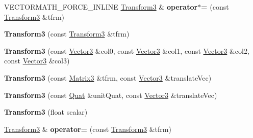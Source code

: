 \begin{DoxyCompactItemize}
\item 
\mbox{\label{classVectormath_1_1Aos_1_1Transform3_a300764b0cf9d1a9cb6655e92787c5190}} 
V\+E\+C\+T\+O\+R\+M\+A\+T\+H\+\_\+\+F\+O\+R\+C\+E\+\_\+\+I\+N\+L\+I\+NE \hyperlink{classVectormath_1_1Aos_1_1Transform3}{Transform3} \& {\bfseries operator$\ast$=} (const \hyperlink{classVectormath_1_1Aos_1_1Transform3}{Transform3} \&tfrm)
\item 
\mbox{\label{classVectormath_1_1Aos_1_1Transform3_a77ffda55c385ce413eb6f393485cc168}} 
{\bfseries Transform3} (const \hyperlink{classVectormath_1_1Aos_1_1Transform3}{Transform3} \&tfrm)
\item 
\mbox{\label{classVectormath_1_1Aos_1_1Transform3_a43872d7a822d5384e3ee631d035d91be}} 
{\bfseries Transform3} (const \hyperlink{classVectormath_1_1Aos_1_1Vector3}{Vector3} \&col0, const \hyperlink{classVectormath_1_1Aos_1_1Vector3}{Vector3} \&col1, const \hyperlink{classVectormath_1_1Aos_1_1Vector3}{Vector3} \&col2, const \hyperlink{classVectormath_1_1Aos_1_1Vector3}{Vector3} \&col3)
\item 
\mbox{\label{classVectormath_1_1Aos_1_1Transform3_a2c98e657db82e24e18c96a8a08f7cf74}} 
{\bfseries Transform3} (const \hyperlink{classVectormath_1_1Aos_1_1Matrix3}{Matrix3} \&tfrm, const \hyperlink{classVectormath_1_1Aos_1_1Vector3}{Vector3} \&translate\+Vec)
\item 
\mbox{\label{classVectormath_1_1Aos_1_1Transform3_a5a2129a250b2482d68f5c366d9d67b59}} 
{\bfseries Transform3} (const \hyperlink{classVectormath_1_1Aos_1_1Quat}{Quat} \&unit\+Quat, const \hyperlink{classVectormath_1_1Aos_1_1Vector3}{Vector3} \&translate\+Vec)
\item 
\mbox{\label{classVectormath_1_1Aos_1_1Transform3_afa3e8f627015d6c105f49b9cc993d980}} 
{\bfseries Transform3} (float scalar)
\item 
\mbox{\label{classVectormath_1_1Aos_1_1Transform3_af3677e0f88598b1c483d6b6df996d932}} 
\hyperlink{classVectormath_1_1Aos_1_1Transform3}{Transform3} \& {\bfseries operator=} (const \hyperlink{classVectormath_1_1Aos_1_1Transform3}{Transform3} \&tfrm)

\end{DoxyCompactItemize}
